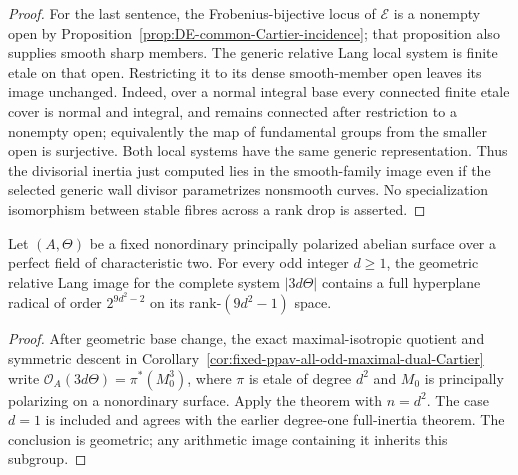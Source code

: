 \begin{proof}
For the last sentence, the Frobenius-bijective locus of \(\mathcal E\)
is a nonempty open by
Proposition~\ref{prop:DE-common-Cartier-incidence}; that proposition
also supplies smooth sharp members.  The generic relative Lang
local system is finite etale on that open.  Restricting it to its
dense smooth-member open leaves its image unchanged.  Indeed, over
a normal integral base every connected finite etale cover is
normal and integral, and remains connected after restriction to a
nonempty open; equivalently the map of fundamental groups from
the smaller open is surjective.  Both local systems have the same
generic representation.  Thus the divisorial inertia just computed
lies in the smooth-family image even if the selected generic wall
divisor parametrizes nonsmooth curves.  No specialization isomorphism
between stable fibres across a rank drop is asserted.
\end{proof}

\begin{corollary}
\label{cor:fixed-ppav-odd-full-hyperplane-inertia}
Let \((A,\Theta)\) be a fixed nonordinary principally polarized
abelian surface over a perfect field of characteristic two.
For every odd integer \(d\ge1\), the geometric relative Lang image
for the complete system \(|3d\Theta|\) contains a full hyperplane
radical of order \(2^{9d^2-2}\) on its rank-\((9d^2-1)\) space.
\end{corollary}
\begin{proof}
After geometric base change, the exact maximal-isotropic quotient
and symmetric descent in
Corollary~\ref{cor:fixed-ppav-all-odd-maximal-dual-Cartier}
write \(\mathcal O_A(3d\Theta)=\pi^*(M_0^3)\), where \(\pi\)
is etale of degree \(d^2\) and \(M_0\) is principally polarizing
on a nonordinary surface.  Apply the theorem with \(n=d^2\).
The case \(d=1\) is included and agrees with the earlier
degree-one full-inertia theorem.  The conclusion is geometric;
any arithmetic image containing it inherits this subgroup.
\end{proof}

